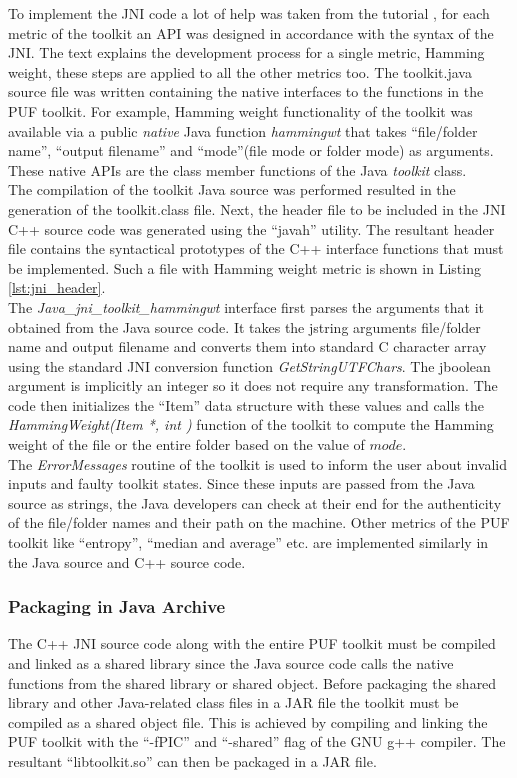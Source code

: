 To implement the JNI code a lot of help was taken from the tutorial \cite{jni_tutorial}, for each metric of the toolkit an API was designed in accordance with the syntax of the JNI. The text explains the development process for a single metric, Hamming weight, these steps are applied to all the other metrics too. The toolkit.java source file was written containing the native interfaces to the functions in the PUF toolkit. For example, Hamming weight functionality of the toolkit was available via a
public \emph{native} Java function \emph{hammingwt} that takes ``file/folder name'', ``output filename'' and ``mode''(file mode or folder mode) as arguments.  These native APIs are the class member functions of the Java \emph{toolkit} class.\\

The compilation of the toolkit Java source was performed resulted in the generation of the toolkit.class file. Next, the header file to be included in the JNI C++ source code was generated using the ``javah'' utility. The resultant header file contains the syntactical prototypes of the C++ interface functions that must be implemented. Such a file with Hamming weight metric is shown in Listing \ref{lst:jni_header}.\\

The \emph{Java\_jni\_toolkit\_hammingwt} interface first parses the arguments that it obtained from the Java source code. It takes the jstring arguments file/folder name and output filename and converts them into standard C character array using the standard JNI conversion function \emph{GetStringUTFChars}. The jboolean argument is implicitly an integer so it does not require any transformation. The code then initializes the ``Item'' data structure with these values and calls the
\emph{HammingWeight(Item *, int )} function of the toolkit to compute the Hamming weight of the file or the entire folder based on the value of $mode$.\\ 

The \emph{ErrorMessages} routine of the toolkit is used to inform the user about invalid inputs and faulty toolkit states. Since these inputs are passed from the Java source as strings, the Java developers can check at their end for the authenticity of the file/folder names and their path on the machine. Other metrics of the PUF toolkit like ``entropy'', ``median and average'' etc. are implemented similarly in the Java source and C++ source code.

\subsubsection{Packaging in Java Archive}
The C++ JNI source code along with the entire PUF toolkit must be compiled and linked as a shared library since the Java source code calls the native functions from the shared library or shared object. Before packaging the shared library and other Java-related class files in a JAR file the toolkit must be compiled as a shared object file. This is achieved by compiling and linking the PUF toolkit with the
``-fPIC'' and ``-shared'' flag of the GNU g++ compiler. The resultant ``libtoolkit.so'' can then be packaged in a JAR file.\\

